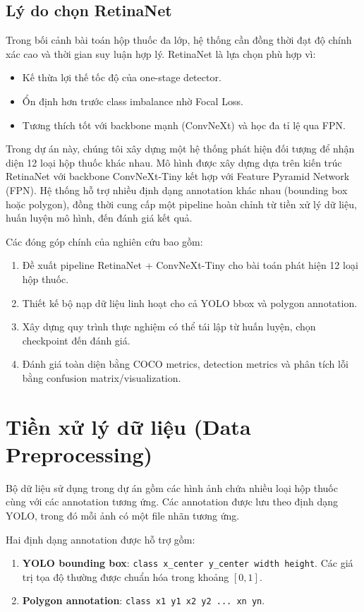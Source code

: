 \documentclass[12pt,a4paper]{article}
\begin{document}
\subsection{Lý do chọn RetinaNet}

Trong bối cảnh bài toán hộp thuốc đa lớp, hệ thống cần đồng thời đạt độ chính xác cao và thời gian suy luận hợp lý. RetinaNet là lựa chọn phù hợp vì:
\begin{itemize}
    \item Kế thừa lợi thế tốc độ của one-stage detector.
    \item Ổn định hơn trước class imbalance nhờ Focal Loss.
    \item Tương thích tốt với backbone mạnh (ConvNeXt) và học đa tỉ lệ qua FPN.
\end{itemize}

Trong dự án này, chúng tôi xây dựng một hệ thống phát hiện đối tượng để nhận diện 12 loại hộp thuốc khác nhau. Mô hình được xây dựng dựa trên kiến trúc RetinaNet với backbone ConvNeXt-Tiny kết hợp với Feature Pyramid Network (FPN). Hệ thống hỗ trợ nhiều định dạng annotation khác nhau (bounding box hoặc polygon), đồng thời cung cấp một pipeline hoàn chỉnh từ tiền xử lý dữ liệu, huấn luyện mô hình, đến đánh giá kết quả.

Các đóng góp chính của nghiên cứu bao gồm:
\begin{enumerate}
    \item Đề xuất pipeline RetinaNet + ConvNeXt-Tiny cho bài toán phát hiện 12 loại hộp thuốc.
    \item Thiết kế bộ nạp dữ liệu linh hoạt cho cả YOLO bbox và polygon annotation.
    \item Xây dựng quy trình thực nghiệm có thể tái lập từ huấn luyện, chọn checkpoint đến đánh giá.
    \item Đánh giá toàn diện bằng COCO metrics, detection metrics và phân tích lỗi bằng confusion matrix/visualization.
\end{enumerate}

\section{Tiền xử lý dữ liệu (Data Preprocessing)}

Bộ dữ liệu sử dụng trong dự án gồm các hình ảnh chứa nhiều loại hộp thuốc cùng với các annotation tương ứng. Các annotation được lưu theo định dạng YOLO, trong đó mỗi ảnh có một file nhãn tương ứng.

Hai định dạng annotation được hỗ trợ gồm:
\begin{enumerate}
    \item \textbf{YOLO bounding box}: \texttt{class x\_center y\_center width height}.
    Các giá trị tọa độ thường được chuẩn hóa trong khoảng $[0,1]$.
    \item \textbf{Polygon annotation}: \texttt{class x1 y1 x2 y2 ... xn yn}.
\end{enumerate}
\end{document}
